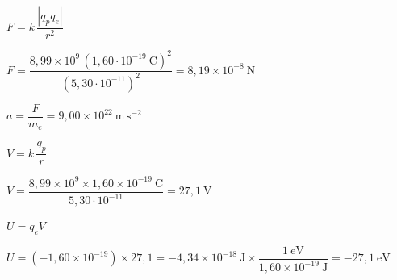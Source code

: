\begin{solapartat}
 $F = k\,\dfrac{|q_p q_e|}{r^2}$

 $F = \dfrac{8,99\times 10^{9}\,(1,60\cdot 10^{-19}\ \mathrm{C})^2}{(5,30\cdot 10^{-11})^2} = 8,19\times 10^{-8}\ \mathrm{N}$

 $a = \dfrac{F}{m_e} = 9,00\times 10^{22}\ \mathrm{m\,s^{-2}}$ \quad{}
\end{solapartat}

\begin{solapartat}
 $V = k\,\dfrac{q_p}{r}$

 $V = \dfrac{8,99\times 10^{9}\times 1,60\times 10^{-19}\ \mathrm{C}}{5,30\cdot 10^{-11}} = 27,1\ \mathrm{V}$

 $U = q_e V$

 $U = (-1,60\times 10^{-19})\times 27,1 = -4,34\times 10^{-18}\ \mathrm{J}\times\dfrac{1\ \mathrm{eV}}{1,60\times 10^{-19}\ \mathrm{J}} = -27,1\ \mathrm{eV}$
\end{solapartat}
